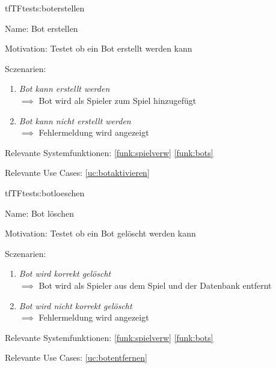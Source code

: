 \begin{description}[leftmargin=5em, style=sameline]

\begin{lhp}{tf}{TF}{tests:boterstellen}
	\item [Name:] Bot erstellen
	\item [Motivation:] Testet ob ein Bot erstellt werden kann
	\item [Sczenarien:] \hfill
		\begin{enumerate}
			\item \textit{Bot kann erstellt werden } \\ $\implies$ Bot wird als Spieler zum Spiel hinzugefügt
			
			\item \textit{ Bot kann nicht erstellt werden} \\ $\implies$ Fehlermeldung wird angezeigt
			
			
		\end{enumerate}
	\item [Relevante Systemfunktionen:] \ref{funk:spielverw} \ref{funk:bots}
	\item [Relevante Use Cases:] \ref{uc:botaktivieren}
\end{lhp}

\end{description}






\begin{description}[leftmargin=5em, style=sameline]

\begin{lhp}{tf}{TF}{tests:botloeschen}
	\item [Name:] Bot löschen
	\item [Motivation:] Testet ob ein Bot gelöscht werden kann
	\item [Sczenarien:] \hfill
		\begin{enumerate}
			\item \textit{Bot wird korrekt gelöscht } \\ $\implies$ Bot wird als Spieler aus dem Spiel und der Datenbank entfernt
			
			\item \textit{ Bot wird nicht korrekt gelöscht} \\ $\implies$ Fehlermeldung wird angezeigt
			
		\end{enumerate}
	\item [Relevante Systemfunktionen:] \ref{funk:spielverw} \ref{funk:bots}
	\item [Relevante Use Cases:] \ref{uc:botentfernen}
\end{lhp}

\end{description}



